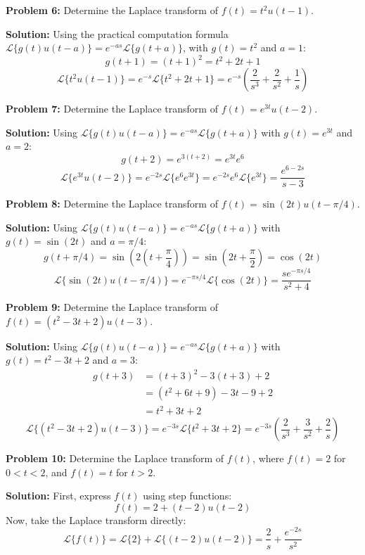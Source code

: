 \documentclass[11pt, letterpaper]{article}
\theoremstyle{definition}
\theoremstyle{remark}
\newcommand{\Lap}{\mathcal{L}}
\begin{document}
\vspace{1em}
\textbf{Problem 6:} Determine the Laplace transform of $f(t) = t^2 u(t-1)$.

\textbf{Solution:}
Using the practical computation formula $\Lap\{g(t)u(t-a)\} = e^{-as}\Lap\{g(t+a)\}$, with $g(t) = t^2$ and $a = 1$:
\[ g(t+1) = (t+1)^2 = t^2 + 2t + 1 \]
\[ \Lap\{t^2 u(t-1)\} = e^{-s} \Lap\{t^2 + 2t + 1\} = e^{-s} \left( \frac{2}{s^3} + \frac{2}{s^2} + \frac{1}{s} \right) \]

\vspace{1em}
\textbf{Problem 7:} Determine the Laplace transform of $f(t) = e^{3t} u(t-2)$.

\textbf{Solution:}
Using $\Lap\{g(t)u(t-a)\} = e^{-as}\Lap\{g(t+a)\}$ with $g(t) = e^{3t}$ and $a = 2$:
\[ g(t+2) = e^{3(t+2)} = e^{3t}e^6 \]
\[ \Lap\{e^{3t} u(t-2)\} = e^{-2s} \Lap\{e^6 e^{3t}\} = e^{-2s} e^6 \Lap\{e^{3t}\} = \frac{e^{6-2s}}{s-3} \]

\vspace{1em}
\textbf{Problem 8:} Determine the Laplace transform of $f(t) = \sin(2t) u(t-\pi/4)$.

\textbf{Solution:}
Using $\Lap\{g(t)u(t-a)\} = e^{-as}\Lap\{g(t+a)\}$ with $g(t) = \sin(2t)$ and $a = \pi/4$:
\[ g(t+\pi/4) = \sin\left(2\left(t + \frac{\pi}{4}\right)\right) = \sin\left(2t + \frac{\pi}{2}\right) = \cos(2t) \]
\[ \Lap\{\sin(2t) u(t-\pi/4)\} = e^{-\pi s / 4} \Lap\{\cos(2t)\} = \frac{s e^{-\pi s / 4}}{s^2 + 4} \]

\vspace{1em}
\textbf{Problem 9:} Determine the Laplace transform of $f(t) = (t^2 - 3t + 2) u(t-3)$.

\textbf{Solution:}
Using $\Lap\{g(t)u(t-a)\} = e^{-as}\Lap\{g(t+a)\}$ with $g(t) = t^2 - 3t + 2$ and $a = 3$:
\begin{align*}
g(t+3) &= (t+3)^2 - 3(t+3) + 2 \\
&= (t^2 + 6t + 9) - 3t - 9 + 2 \\
&= t^2 + 3t + 2
\end{align*}
\[ \Lap\{(t^2 - 3t + 2) u(t-3)\} = e^{-3s} \Lap\{t^2 + 3t + 2\} = e^{-3s} \left( \frac{2}{s^3} + \frac{3}{s^2} + \frac{2}{s} \right) \]

\vspace{1em}
\textbf{Problem 10:} Determine the Laplace transform of $f(t)$, where $f(t) = 2$ for $0 < t < 2$, and $f(t) = t$ for $t > 2$.

\textbf{Solution:}
First, express $f(t)$ using step functions:
\[ f(t) = 2 + (t - 2)u(t-2) \]
Now, take the Laplace transform directly:
\[ \Lap\{f(t)\} = \Lap\{2\} + \Lap\{(t-2)u(t-2)\} = \frac{2}{s} + \frac{e^{-2s}}{s^2} \]
\end{document}
